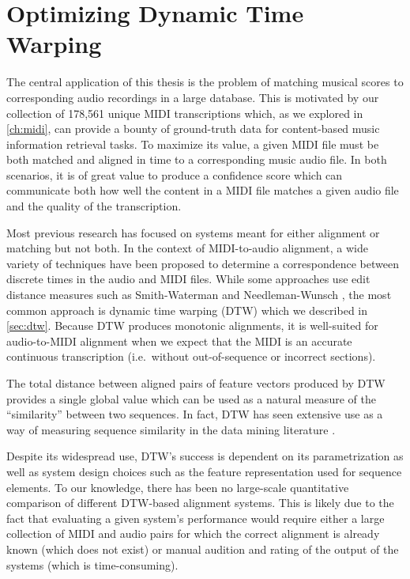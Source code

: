 \chapter{Optimizing Dynamic Time Warping}
\label{ch:dtw}

The central application of this thesis is the problem of matching musical scores to corresponding audio recordings in a large database.
This is motivated by our collection of 178,561 unique MIDI transcriptions which, as we explored in \cref{ch:midi}, can provide a bounty of ground-truth data for content-based music information retrieval tasks.
To maximize its value, a given MIDI file must be both matched and aligned in time to a corresponding music audio file.
In both scenarios, it is of great value to produce a confidence score which can communicate both how well the content in a MIDI file matches a given audio file and the quality of the transcription.

Most previous research has focused on systems meant for either alignment or matching but not both.
In the context of MIDI-to-audio alignment, a wide variety of techniques have been proposed to determine a correspondence between discrete times in the audio and MIDI files.
While some approaches use edit distance measures such as Smith-Waterman \cite{ewert2012towards} and Needleman-Wunsch \cite{grachten2013automatic}, the most common approach is dynamic time warping (DTW) which we described in \cref{sec:dtw}.
Because DTW produces monotonic alignments, it is well-suited for audio-to-MIDI alignment when we expect that the MIDI is an accurate continuous transcription (i.e.\ without out-of-sequence or incorrect sections).

The total distance between aligned pairs of feature vectors produced by DTW provides a single global value which can be used as a natural measure of the ``similarity'' between two sequences.
In fact, DTW has seen extensive use as a way of measuring sequence similarity in the data mining literature \cite{berndt1994using}.

Despite its widespread use, DTW's success is dependent on its parametrization as well as system design choices such as the feature representation used for sequence elements.
To our knowledge, there has been no large-scale quantitative comparison of different DTW-based alignment systems.
This is likely due to the fact that evaluating a given system's performance would require either a large collection of MIDI and audio pairs for which the correct alignment is already known (which does not exist) or manual audition and rating of the output of the systems (which is time-consuming).

